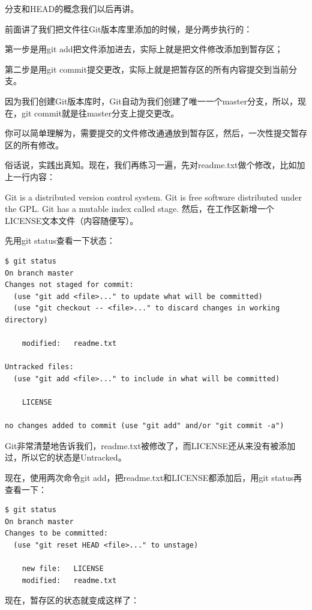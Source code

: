 分支和HEAD的概念我们以后再讲。

前面讲了我们把文件往Git版本库里添加的时候，是分两步执行的：

第一步是用git add把文件添加进去，实际上就是把文件修改添加到暂存区；

第二步是用git commit提交更改，实际上就是把暂存区的所有内容提交到当前分支。

因为我们创建Git版本库时，Git自动为我们创建了唯一一个master分支，所以，现在，git commit就是往master分支上提交更改。

你可以简单理解为，需要提交的文件修改通通放到暂存区，然后，一次性提交暂存区的所有修改。

俗话说，实践出真知。现在，我们再练习一遍，先对readme.txt做个修改，比如加上一行内容：

Git is a distributed version control system.
Git is free software distributed under the GPL.
Git has a mutable index called stage.
然后，在工作区新增一个LICENSE文本文件（内容随便写）。

先用git status查看一下状态：

\begin{verbatim}
$ git status
On branch master
Changes not staged for commit:
  (use "git add <file>..." to update what will be committed)
  (use "git checkout -- <file>..." to discard changes in working directory)

	modified:   readme.txt

Untracked files:
  (use "git add <file>..." to include in what will be committed)

	LICENSE

no changes added to commit (use "git add" and/or "git commit -a")
\end{verbatim}

Git非常清楚地告诉我们，readme.txt被修改了，而LICENSE还从来没有被添加过，所以它的状态是Untracked。

现在，使用两次命令git add，把readme.txt和LICENSE都添加后，用git status再查看一下：

\begin{verbatim}
$ git status
On branch master
Changes to be committed:
  (use "git reset HEAD <file>..." to unstage)

	new file:   LICENSE
	modified:   readme.txt
\end{verbatim}

现在，暂存区的状态就变成这样了：

